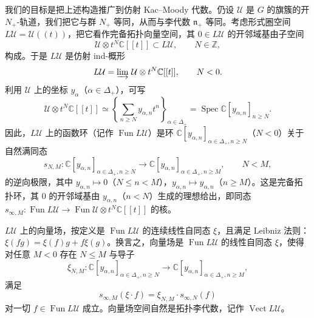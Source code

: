 我们的目标是把上述构造推广到仿射 Kac--Moody 代数。仍设 $\mathcal{U}$ 是 $G$ 的旗簇的开 $N_+$-轨道，我们把它与群 $N_+$ 等同，从而与李代数 $\mathfrak{n}_+$ 等同。考虑形式圈空间 $L\mathcal{U}=\mathcal{U}((t))$，把它看作完备拓扑向量空间，其 $0\in L\mathcal{U}$ 的开邻域基由子空间
\[
    \mathcal{U}\otimes t^N\mathbb{C}[[t]]\subset L\mathcal{U},\qquad N\in\mathbb{Z},
\]
构成。于是 $L\mathcal{U}$ 是仿射 ind-概形
\[
    L\mathcal{U}=\varinjlim\,\mathcal{U}\otimes t^N\mathbb{C}[[t]],\qquad N<0.
\]
利用 $\mathcal{U}$ 上的坐标 $y_\alpha$（$\alpha\in\Delta_+$），可写
\[
    \mathcal{U}\otimes t^N\mathbb{C}[[t]]
    \simeq\left\{\sum_{n\ge N}y_{\alpha,n}t^n\right\}_{\alpha\in\Delta_+}
    =\operatorname{Spec}\mathbb{C}[y_{\alpha,n}]_{n\ge N}.
\]
因此，$L\mathcal{U}$ 上的函数环（记作 $\operatorname{Fun}L\mathcal{U}$）是环 $\mathbb{C}[y_{\alpha,n}]_{\alpha\in\Delta_+,n\ge N}$（$N<0$）关于自然满同态
\[
    s_{N,M}:\mathbb{C}[y_{\alpha,n}]_{\alpha\in\Delta_+,n\ge N}
    \to\mathbb{C}[y_{\alpha,n}]_{\alpha\in\Delta_+,n\ge M},
    \qquad N<M,
\]
的逆向极限，其中 $y_{\alpha,n}\mapsto0$（$N\le n<M$），$y_{\alpha,n}\mapsto y_{\alpha,n}$（$n\ge M$）。这是完备拓扑环，其 $0$ 的开邻域基由 $y_{\alpha,n}$（$n<N$）生成的理想给出，即同态 $s_{\infty,M}:\operatorname{Fun}L\mathcal{U}\to\operatorname{Fun}\mathcal{U}\otimes t^N\mathbb{C}[[t]]$ 的核。


$L\mathcal{U}$ 上的向量场，按定义是 $\operatorname{Fun}L\mathcal{U}$ 的连续线性自同态 $\xi$，且满足 Leibniz 法则：$\xi(fg)=\xi(f)g+f\xi(g)$。换言之，向量场是 $\operatorname{Fun}L\mathcal{U}$ 的线性自同态 $\xi$，使得对任意 $M<0$ 存在 $N\le M$ 与导子
\[
    \xi_{N,M}:\mathbb{C}[y_{\alpha,n}]_{\alpha\in\Delta_+,n\ge N}
    \to\mathbb{C}[y_{\alpha,n}]_{\alpha\in\Delta_+,n\ge M},
\]
满足
\[
    s_{\infty,M}(\xi\cdot f)=\xi_{N,M}\cdot s_{\infty,N}(f)
\]
对一切 $f\in\operatorname{Fun}L\mathcal{U}$ 成立。向量场空间自然是拓扑李代数，记作 $\operatorname{Vect}L\mathcal{U}$。

